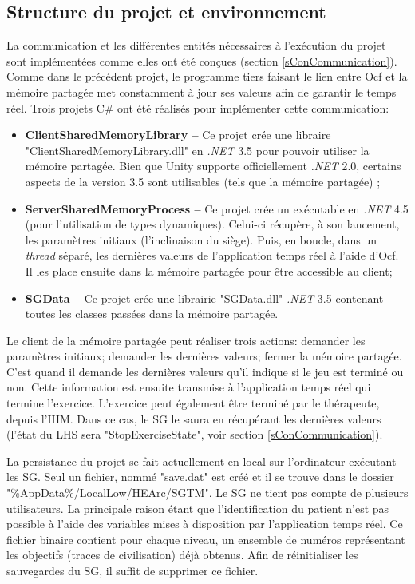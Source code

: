 	\subsection*{Structure du projet et environnement}
	La communication et les différentes entités nécessaires à l'exécution du projet sont implémentées comme elles ont été conçues (section \ref{sConCommunication}). Comme dans le précédent projet, le programme tiers faisant le lien entre Ocf et la mémoire partagée met constamment à jour ses valeurs afin de garantir le temps réel. Trois projets C\# \cite{CSharp_website} ont été réalisés pour implémenter cette communication:
	\begin{itemize}
		\item \textbf{ClientSharedMemoryLibrary --} Ce projet crée une libraire "ClientSharedMemoryLibrary.dll" en \textit{.NET} 3.5 pour pouvoir utiliser la mémoire partagée. Bien que Unity supporte officiellement \textit{.NET} 2.0, certains aspects de la version 3.5 sont utilisables (tels que la mémoire partagée) \cite{UnityDotNETVersion};
		\item \textbf{ServerSharedMemoryProcess --} Ce projet crée un exécutable en \textit{.NET} 4.5 (pour l'utilisation de types dynamiques). Celui-ci récupère, à son lancement, les paramètres initiaux (l'inclinaison du siège). Puis, en boucle, dans un \textit{thread} séparé, les dernières valeurs de l'application temps réel à l'aide d'Ocf. Il les place ensuite dans la mémoire partagée pour être accessible au client;
		\item \textbf{SGData --} Ce projet crée une librairie "SGData.dll" \textit{.NET} 3.5 contenant toutes les classes passées dans la mémoire partagée.
	\end{itemize}
	Le client de la mémoire partagée peut réaliser trois actions: demander les paramètres initiaux; demander les dernières valeurs; fermer la mémoire partagée. C'est quand il demande les dernières valeurs qu'il indique si le jeu est terminé ou non. Cette information est ensuite transmise à l'application temps réel qui termine l'exercice. L'exercice peut également être terminé par le thérapeute, depuis l'IHM. Dans ce cas, le SG le saura en récupérant les dernières valeurs (l'état du LHS sera "StopExerciseState", voir section \ref{sConCommunication}).	
	
	La persistance du projet se fait actuellement en local sur l'ordinateur exécutant les SG. Seul un fichier, nommé "save.dat" est créé et il se trouve dans le dossier "\%AppData\%/LocalLow/HEArc/SGTM". Le SG ne tient pas compte de plusieurs utilisateurs. La principale raison étant que l'identification du patient n'est pas possible à l'aide des variables mises à disposition par l'application temps réel. Ce fichier binaire contient pour chaque niveau, un ensemble de numéros représentant les objectifs (traces de civilisation) déjà obtenus. Afin de réinitialiser les sauvegardes du SG, il suffit de supprimer ce fichier.

